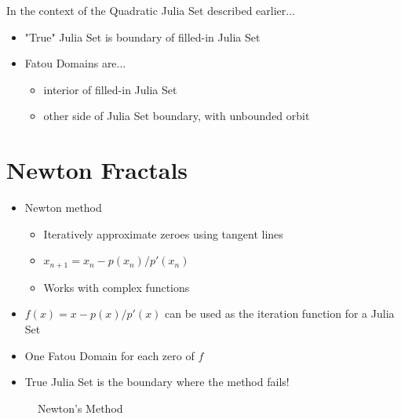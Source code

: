 \documentclass{article}
\begin{document}
In the context of the Quadratic Julia Set described earlier...
\begin{itemize}
    \item "True" Julia Set is boundary of filled-in Julia Set
    \item Fatou Domains are...
        \begin{itemize}
            \item interior of filled-in Julia Set
            \item other side of Julia Set boundary, with unbounded orbit
        \end{itemize}
\end{itemize}


\section{Newton Fractals}

\begin{itemize}
    \item Newton method
    \begin{itemize}
        \item Iteratively approximate zeroes using tangent lines
        \item $x_{n+1} = x_n - p(x_n)/p'(x_n)$
        \item Works with complex functions
    \end{itemize}
    \item $f(x) = x - p(x)/p'(x)$ can be used as the iteration function for a Julia Set
    \item One Fatou Domain for each zero of $f$
    \item True Julia Set is the boundary where the method fails!
\end{itemize}


\begin{figure}[!htbp]
    \centering
    \caption{Newton's Method} %
\end{figure}%


%
\end{document}
